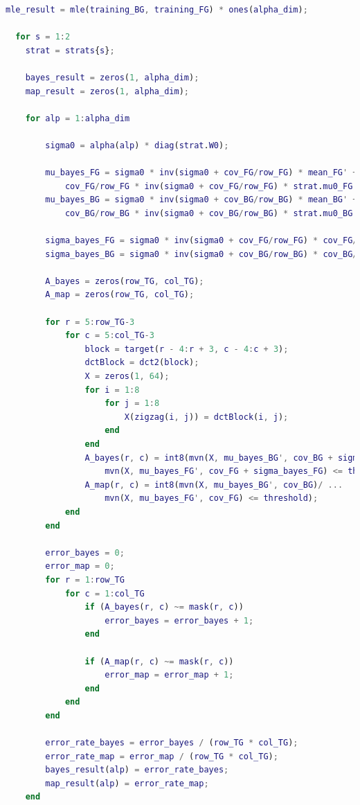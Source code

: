 \documentclass{article}
\begin{document}
\begin{lstlisting}[language=Matlab]
  mle_result = mle(training_BG, training_FG) * ones(alpha_dim);

  for s = 1:2
    strat = strats{s};
    
    bayes_result = zeros(1, alpha_dim);
    map_result = zeros(1, alpha_dim);
    
    for alp = 1:alpha_dim
    
        sigma0 = alpha(alp) * diag(strat.W0);
        
        mu_bayes_FG = sigma0 * inv(sigma0 + cov_FG/row_FG) * mean_FG' + ...
            cov_FG/row_FG * inv(sigma0 + cov_FG/row_FG) * strat.mu0_FG';
        mu_bayes_BG = sigma0 * inv(sigma0 + cov_BG/row_BG) * mean_BG' + ...
            cov_BG/row_BG * inv(sigma0 + cov_BG/row_BG) * strat.mu0_BG';
        
        sigma_bayes_FG = sigma0 * inv(sigma0 + cov_FG/row_FG) * cov_FG/row_FG;
        sigma_bayes_BG = sigma0 * inv(sigma0 + cov_BG/row_BG) * cov_BG/row_BG;
        
        A_bayes = zeros(row_TG, col_TG);
        A_map = zeros(row_TG, col_TG);
        
        for r = 5:row_TG-3
            for c = 5:col_TG-3
                block = target(r - 4:r + 3, c - 4:c + 3);
                dctBlock = dct2(block);
                X = zeros(1, 64);
                for i = 1:8
                    for j = 1:8
                        X(zigzag(i, j)) = dctBlock(i, j);
                    end
                end
                A_bayes(r, c) = int8(mvn(X, mu_bayes_BG', cov_BG + sigma_bayes_BG)/ ...
                    mvn(X, mu_bayes_FG', cov_FG + sigma_bayes_FG) <= threshold);
                A_map(r, c) = int8(mvn(X, mu_bayes_BG', cov_BG)/ ...
                    mvn(X, mu_bayes_FG', cov_FG) <= threshold);
            end
        end
        
        error_bayes = 0;
        error_map = 0;
        for r = 1:row_TG
            for c = 1:col_TG
                if (A_bayes(r, c) ~= mask(r, c))
                    error_bayes = error_bayes + 1;
                end
        
                if (A_map(r, c) ~= mask(r, c))
                    error_map = error_map + 1;
                end
            end
        end
        
        error_rate_bayes = error_bayes / (row_TG * col_TG);
        error_rate_map = error_map / (row_TG * col_TG);
        bayes_result(alp) = error_rate_bayes;
        map_result(alp) = error_rate_map;
    end
    

\end{lstlisting}
\end{document}
